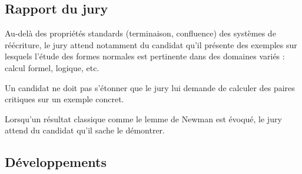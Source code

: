 \documentclass[../../agregation.tex]{subfiles}
\begin{document}

\subsection{Rapport du jury}

\begin{aquote}{}
Au-delà des propriétés standards (terminaison, confluence) des systèmes de réécriture, le jury attend notamment du candidat qu'il présente des exemples sur lesquels l'étude des formes normales est pertinente dans des domaines variés : calcul formel, logique, etc.

Un candidat ne doit pas s'étonner que le jury lui demande de calculer des paires critiques sur un exemple concret.

Lorsqu'un résultat classique comme le lemme de Newman est évoqué, le jury attend du candidat qu'il sache le démontrer.
\end{aquote}

\subsection{Développements}

\dvts
\end{document}
